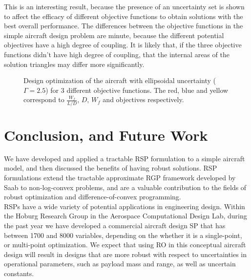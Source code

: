 \documentclass{article}
\begin{document}
This is an interesting result, because the presence of an uncertainty set is shown to affect the efficacy of different objective functions to obtain solutions with the best overall performance. The differences between the objective functions in the simple aircraft design problem are minute, because the different potential objectives have a high degree of coupling. It is likely that, if the three objective functions didn't have high degree of coupling, that the internal areas of the solution triangles may differ more significantly. 

\begin{figure}[H]
\caption{Design optimization of the aircraft with ellipsoidal uncertainty ($\Gamma = 2.5$) for 3 different objective functions. The red, blue and yellow correspond to $\frac{W_f}{L/D}$, $D$, $W_f$ and objectives respectively.}
\begin{center}
\end{center}
\end{figure}


\section{Conclusion, and Future Work}

We have developed and applied a tractable RSP formulation to a simple aircraft model, and then discussed the benefits of having robust solutions. RSP formulations extend the tractable approximate RGP framework developed by Saab to non-log-convex problems, and are a valuable contribution to the fields of robust optimization and difference-of-convex programming.\\

RSPs have a wide variety of potential applications in engineering design. Within the Hoburg Research Group in the Aerospace Computational Design Lab, during the past year we have developed a commercial aircraft design SP that has between 1700 and 8000 variables, depending on the whether it is a single-point, or multi-point optimization. We expect that using RO in this conceptual aircraft design will result in designs that are more robust with respect to uncertainties in operational parameters, such as payload mass and range, as well as uncertain constants.
\end{document}
